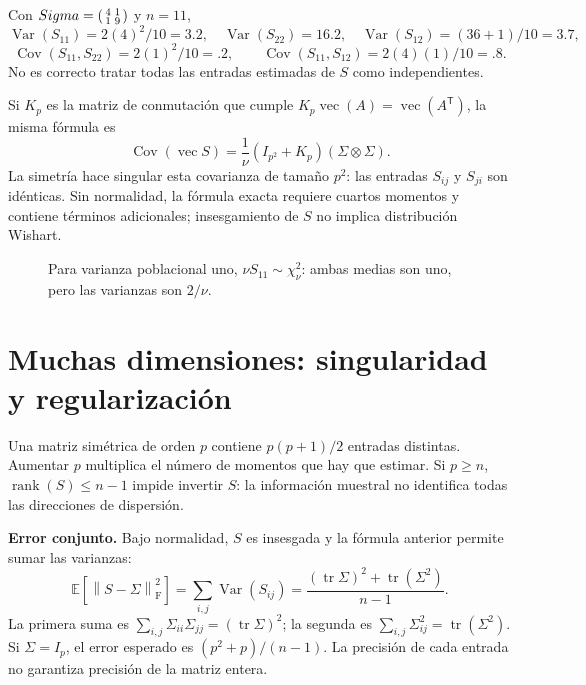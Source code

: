 \documentclass[11pt,a4paper]{article}
\newcommand{\E}{\mathbb E}
\newcommand{\T}{^{\mathsf T}}
\newcommand{\norm}[1]{\left\lVert #1\right\rVert}
\DeclareMathOperator{\Var}{Var}
\DeclareMathOperator{\Cov}{Cov}
\DeclareMathOperator{\tr}{tr}
\DeclareMathOperator{\rank}{rank}
\DeclareMathOperator{\vecop}{vec}
\newcommand{\F}{_{\mathrm F}}
\newcommand{\topic}[2]{\clearpage\section{#1}\label{#2}}
\theoremstyle{definition}\newtheorem{definicion}[teorema]{Definición}
\begin{document}
\begin{ejemplo}
Con $\Sigma=\begin{psmallmatrix}4&1\\1&9\end{psmallmatrix}$ y $n=11$,
\[
\Var(S_{11})=2(4)^2/10=3.2,\quad
\Var(S_{22})=16.2,\quad \Var(S_{12})=(36+1)/10=3.7,
\]
\[
\Cov(S_{11},S_{22})=2(1)^2/10=.2,\qquad
\Cov(S_{11},S_{12})=2(4)(1)/10=.8.
\]
No es correcto tratar todas las entradas estimadas de $S$ como independientes.
\end{ejemplo}
Si $K_p$ es la matriz de conmutación que cumple
$K_p\vecop(A)=\vecop(A\T)$, la misma fórmula es
\[
\Cov(\vecop S)=\frac1\nu(I_{p^2}+K_p)(\Sigma\otimes\Sigma).
\]
La simetría hace singular esta covarianza de tamaño $p^2$: las entradas
$S_{ij}$ y $S_{ji}$ son idénticas.
Sin normalidad, la fórmula exacta requiere cuartos momentos y contiene
términos adicionales; insesgamiento de $S$ no implica distribución Wishart.


\begin{figure}[H]\centering
{}
\caption{Para varianza poblacional uno, $\nu S_{11}\sim\chi^2_\nu$: ambas medias son uno, pero las varianzas son $2/\nu$.}
\end{figure}
\topic{Muchas dimensiones: singularidad y regularización}{s26}
Una matriz simétrica de orden $p$ contiene $p(p+1)/2$ entradas distintas.
Aumentar $p$ multiplica el número de momentos que hay que estimar.
Si $p\ge n$, $\rank(S)\le n-1$ impide invertir $S$:
la información muestral no identifica todas las direcciones de dispersión.

\textbf{Error conjunto.} Bajo normalidad, $S$ es insesgada y
la fórmula anterior permite sumar las varianzas:
\[
\E[\norm{S-\Sigma}\F^2]
=\sum_{i,j}\Var(S_{ij})
=\boxed{\frac{(\tr\Sigma)^2+\tr(\Sigma^2)}{n-1}}.
\]
La primera suma es $\sum_{i,j}\Sigma_{ii}\Sigma_{jj}=(\tr\Sigma)^2$;
la segunda es $\sum_{i,j}\Sigma_{ij}^2=\tr(\Sigma^2)$.
Si $\Sigma=I_p$, el error esperado es $(p^2+p)/(n-1)$.
La precisión de cada entrada no garantiza precisión de la matriz entera.
\end{document}
